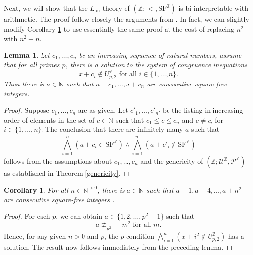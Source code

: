 \documentclass[letterpaper]{amsart}
\newcommand{\nn}{\mathbb{N}}
\newcommand{\zz}{\mathbb{Z}}
\newcommand{\sU}{\mathscr{U}}
\newcommand{\sP}{\mathscr{P}}
\newcommand{\SF}{\mathrm{SF}^\zz}
\newtheorem{lem}[thm]{Lemma}
\newtheorem{cor}[thm]{Corollary}
\begin{document}
\noindent Next, we will show that the $L_{\mathrm{ou}}$-theory of $(\zz; <, \SF)$ is bi-interpretable with arithmetic. The proof follow closely the arguments from \cite{BJW}. In fact, we can slightly modify Corollary \ref{Consecutivesquarefree}  to use essentially the same proof at the cost of replacing $n^2$ with $n^2+n$. 
\begin{lem}
Let $c_1, \ldots, c_n$ be an increasing sequence of natural numbers, assume that for all primes $p$, there is a solution to the system of congruence inequations
$$ x + c_i \notin U^\zz_{p, 2} \text{ for all } i \in \{1, \ldots, n\}.$$ Then there is $a \in \nn$ such that $a+c_1, \ldots, a+c_n$ are consecutive square-free integers.
\end{lem}
\begin{proof}
Suppose $c_1, \ldots, c_n$ are as given. Let $c'_1, \ldots, c'_{n'}$ be the listing in increasing order of elements in the set of  $c \in \nn$ such that $c_1 \leq c \leq c_n$ and $c \neq c_i$ for $i \in \{1, \ldots, n\}$. The conclusion that there are infinitely many $a$ such that 
$$  \bigwedge_{i=1}^n (a+c_i \in \SF) \wedge \bigwedge_{i=1}^{n'} (a+c'_i \notin \SF) $$
follows from the assumptions about $c_1, \ldots, c_n$ and the genericity of $( \zz; \sU^\zz, \sP^\zz)$ as established in Theorem \ref{genericity}.
\end{proof}
\begin{cor} \label{Consecutivesquarefree}
For all $n\in \nn^{>0}$, there is $a \in \nn$ such that $a+1, a+4, \ldots, a+n^2$ are consecutive square-free integers .
\end{cor}
\begin{proof}
For each $p$, we can obtain $a\in \{1,2,\ldots,p^2-1\} $ such that 
$$a\nequiv_{p^2}-m^2 \text{ for all } m.$$ Hence, for any given $n>0$ and $p$, the $p$-condition $\bigwedge_{i=1}^{n}(x+i^2\notin U^{\zz}_{p,2})$ has a solution. The result now follows immediately  from the preceding lemma.
\end{proof}
\end{document}

